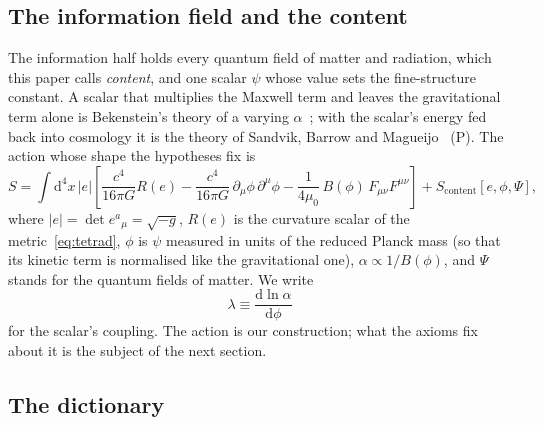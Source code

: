 \documentclass[11pt,a4paper]{article}
\theoremstyle{definition}
\theoremstyle{remark}
\newcommand{\tagP}{\textsf{(P)}}
\newcommand{\dd}{\mathrm{d}}
\theoremstyle{definition}
\begin{document}
\subsection{The information field and the content}

The information half holds every quantum field of matter and radiation, which this paper calls \emph{content}, and one scalar $\psi$ whose
value sets the fine-structure constant. A scalar that multiplies the Maxwell term and leaves the gravitational term alone is Bekenstein's
theory of a varying $\alpha$~\cite{bekenstein82}; with the scalar's energy fed back into cosmology it is the theory of Sandvik, Barrow
and Magueijo~\cite{bsbm} \tagP. The action whose shape the hypotheses fix is
\begin{equation}\label{eq:action}
S=\int\dd^4x\,|e|\left[\frac{c^4}{16\pi G}R(e)-\frac{c^4}{16\pi G}\,\partial_\mu\phi\,\partial^\mu\phi-\frac{1}{4\mu_0}\,B(\phi)\,
F_{\mu\nu}F^{\mu\nu}\right]+S_{\text{content}}[e,\phi,\Psi],
\end{equation}
where $|e|=\det e^a{}_\mu=\sqrt{-g}$, $R(e)$ is the curvature scalar of the metric~\eqref{eq:tetrad}, $\phi$ is $\psi$ measured in units of
the reduced Planck mass (so that its kinetic term is normalised like the gravitational one), $\alpha\propto1/B(\phi)$, and $\Psi$ stands for
the quantum fields of matter. We write
\begin{equation}\label{eq:lambda}
\lambda\equiv\frac{\dd\ln\alpha}{\dd\phi}
\end{equation}
for the scalar's coupling. The action is our construction; what the axioms fix about it is the subject of the next section.

\subsection{The dictionary}
\end{document}

